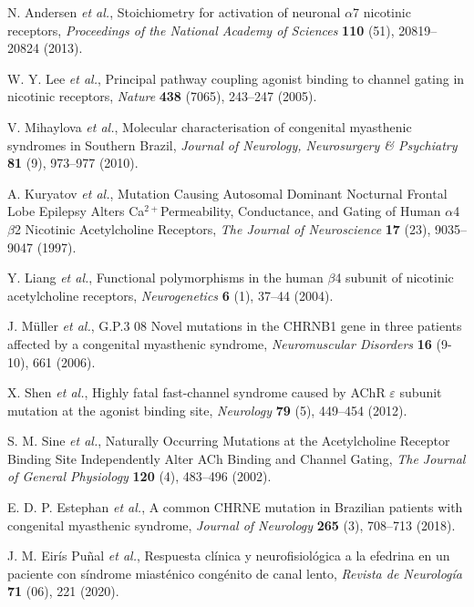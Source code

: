 N. Andersen {\em et al.}, Stoichiometry for activation of neuronal $\alpha$7 nicotinic receptors, {\em Proceedings of the National Academy of Sciences} {\bf 110} (51), 20819--20824 (2013).

W. Y. Lee {\em et al.}, Principal pathway coupling agonist binding to channel gating in nicotinic receptors, {\em Nature} {\bf 438} (7065), 243--247 (2005).

V. Mihaylova {\em et al.}, Molecular characterisation of congenital myasthenic syndromes in Southern Brazil, {\em Journal of Neurology, Neurosurgery \& Psychiatry} {\bf 81} (9), 973--977 (2010).

A. Kuryatov {\em et al.}, Mutation Causing Autosomal Dominant Nocturnal Frontal Lobe Epilepsy Alters Ca$^{2+}$Permeability, Conductance, and Gating of Human $\alpha$4$\beta$2 Nicotinic Acetylcholine Receptors, {\em The Journal of Neuroscience} {\bf 17} (23), 9035--9047 (1997).

Y. Liang {\em et al.}, Functional polymorphisms in the human $\beta$4 subunit of nicotinic acetylcholine receptors, {\em Neurogenetics} {\bf 6} (1), 37--44 (2004).

J. M{\"u}ller {\em et al.}, G.P.3 08 Novel mutations in the CHRNB1 gene in three patients affected by a congenital myasthenic syndrome, {\em Neuromuscular Disorders} {\bf 16} (9-10), 661 (2006).

X. Shen {\em et al.}, Highly fatal fast-channel syndrome caused by AChR $\varepsilon$ subunit mutation at the agonist binding site, {\em Neurology} {\bf 79} (5), 449--454 (2012).

S. M. Sine {\em et al.}, Naturally Occurring Mutations at the Acetylcholine Receptor Binding Site Independently Alter ACh Binding and Channel Gating, {\em The Journal of General Physiology} {\bf 120} (4), 483--496 (2002).

E. D. P. Estephan {\em et al.}, A common CHRNE mutation in Brazilian patients with congenital myasthenic syndrome, {\em Journal of Neurology} {\bf 265} (3), 708--713 (2018).

J. M. Eir{\'i}s Pu{\~n}al {\em et al.}, Respuesta cl{\'i}nica y neurofisiol{\'o}gica a la efedrina en un paciente con s{\'i}ndrome miast{\'e}nico cong{\'e}nito de canal lento, {\em Revista de Neurolog{\'i}a} {\bf 71} (06), 221 (2020).

